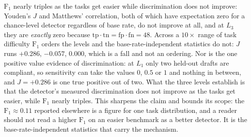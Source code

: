 \documentclass[11pt]{article}
\begin{document}
$\mathrm{F}_1$ nearly triples as the tasks get easier while discrimination does not improve: Youden's $J$ and Matthews' correlation, both of which have expectation zero
for a chance-level detector regardless of base rate, do not improve at all, and at $L_3$ they are
\emph{exactly} zero because $\mathrm{tp}\cdot\mathrm{tn} = \mathrm{fp}\cdot\mathrm{fn} = 48$.
Across a $10\times$ range of task difficulty $\mathrm{F}_1$ orders the levels and the
base-rate-independent statistics do not: $J$ runs $+0.286$, $-0.057$, $0.000$, which is a fall and
not an ordering. Nor is the one positive value evidence of discrimination: at $L_1$ only two
held-out drafts are compliant, so sensitivity can take the values $0$, $0.5$ or $1$ and nothing in
between, and $J = +0.286$ is one true positive out of two. What the three levels establish is that
the detector's measured discrimination does not improve as the tasks get easier, while
$\mathrm{F}_1$ nearly triples. This sharpens the claim and bounds its scope:
the $\mathrm{F}_1 \approx 0.11$ reported elsewhere is a figure for one task
distribution, and a reader should not read a higher $\mathrm{F}_1$ on an easier benchmark as a
better detector. It is the base-rate-independent statistics that carry the mechanism.
\end{document}
